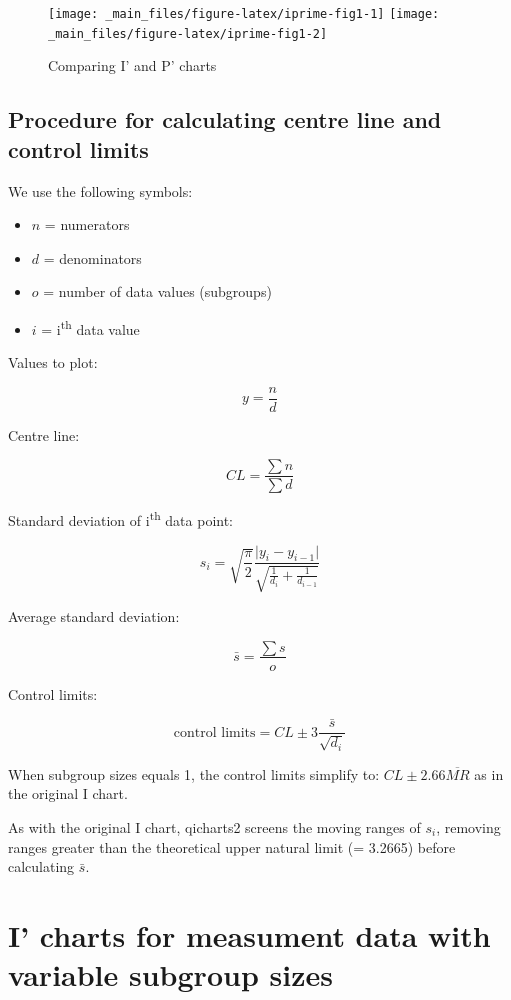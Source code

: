 \documentclass[
]{book}
\providecommand{\tightlist}{%
  \setlength{\itemsep}{0pt}\setlength{\parskip}{0pt}}
\begin{document}
\begin{figure}
\texttt{[image: \_main\_files/figure-latex/iprime-fig1-1]} \texttt{[image: \_main\_files/figure-latex/iprime-fig1-2]} \caption{Comparing I' and P' charts}\label{fig:iprime-fig1}
\end{figure}

\subsection{Procedure for calculating centre line and control limits}\label{procedure-for-calculating-centre-line-and-control-limits}

We use the following symbols:

\begin{itemize}
\tightlist
\item
  \(n\) = numerators
\item
  \(d\) = denominators
\item
  \(o\) = number of data values (subgroups)
\item
  \(i\) = i\textsuperscript{th} data value
\end{itemize}

Values to plot:

\[
y = \frac{n}{d}
\]

Centre line:

\[
CL = \frac{\sum{n}}{\sum{d}}
\]

Standard deviation of i\textsuperscript{th} data point:

\[
s_i = \sqrt{\frac{\pi}{2}}\frac{\vert{}y_i-y_{i-1}\vert{}}{\sqrt{\frac{1}{d_i}+\frac{1}{d_{i-1}}}}
\]

Average standard deviation:

\[
\bar{s} = \frac{\sum{s}}{o}
\]

Control limits:

\[
\text{control limits} = CL \pm 3 \frac{\bar{s}}{\sqrt{d_i}}
\]

When subgroup sizes equals 1, the control limits simplify to: \(CL \pm 2.66\overline{MR}\) as in the original I chart.

As with the original I chart, qicharts2 screens the moving ranges of \(s_i\), removing ranges greater than the theoretical upper natural limit (= 3.2665) before calculating \(\bar{s}\).

\section{I' charts for measument data with variable subgroup sizes}\label{i-charts-for-measument-data-with-variable-subgroup-sizes}
\end{document}
